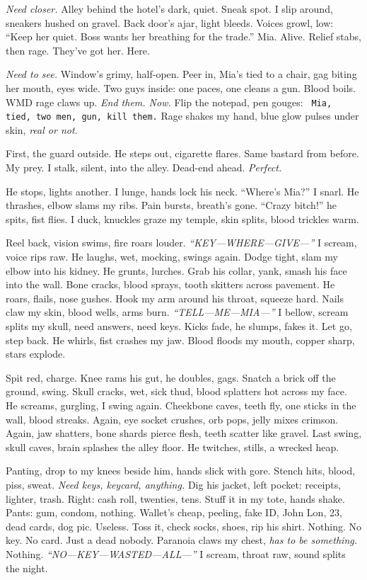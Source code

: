 \documentclass[12pt]{article}
\newcommand{\note}[1]{\texttt{\small \color{DarkGray} #1}}
\begin{document}
\textit{Need closer.} Alley behind the hotel’s dark, quiet. Sneak spot. I slip around, sneakers hushed on gravel. Back door’s ajar, light bleeds. Voices growl, low: “Keep her quiet. Boss wants her breathing for the trade.” \textnormal{Mia}. Alive. Relief stabs, then rage. They’ve got her. Here.

\textit{Need to see.} Window’s grimy, half-open. Peer in, \textnormal{Mia}’s tied to a chair, gag biting her mouth, eyes wide. Two guys inside: one paces, one cleans a gun. Blood boils. WMD rage claws up. \textit{End them. Now.} Flip the notepad, pen gouges: \note{Mia, tied, two men, gun, kill them.} Rage shakes my hand, blue glow pulses under skin, \textit{real or not.}

First, the guard outside. He steps out, cigarette flares. Same bastard from before. My prey. I stalk, silent, into the alley. Dead-end ahead. \textit{Perfect.}

He stops, lights another. I lunge, hands lock his neck. “Where’s \textnormal{Mia}?” I snarl. He thrashes, elbow slams my ribs. Pain bursts, breath’s gone. “Crazy bitch!” he spits, fist flies. I duck, knuckles graze my temple, skin splits, blood trickles warm.

Reel back, vision swims, fire roars louder. \textit{“KEY—WHERE—GIVE—”} I scream, voice rips raw. He laughs, wet, mocking, swings again. Dodge tight, slam my elbow into his kidney. He grunts, lurches. Grab his collar, yank, smash his face into the wall. Bone cracks, blood sprays, tooth skitters across pavement. He roars, flails, nose gushes. Hook my arm around his throat, squeeze hard. Nails claw my skin, blood wells, arms burn. \textit{“TELL—ME—MIA—”} I bellow, scream splits my skull, need answers, need keys. Kicks fade, he slumps, fakes it. Let go, step back. He whirls, fist crashes my jaw. Blood floods my mouth, copper sharp, stars explode.

Spit red, charge. Knee rams his gut, he doubles, gags. Snatch a brick off the ground, swing. Skull cracks, wet, sick thud, blood splatters hot across my face. He screams, gurgling, I swing again. Cheekbone caves, teeth fly, one sticks in the wall, blood streaks. Again, eye socket crushes, orb pops, jelly mixes crimson. Again, jaw shatters, bone shards pierce flesh, teeth scatter like gravel. Last swing, skull caves, brain splashes the alley floor. He twitches, stills, a wrecked heap.

Panting, drop to my knees beside him, hands slick with gore. Stench hits, blood, piss, sweat. \textit{Need keys, keycard, anything.} Dig his jacket, left pocket: receipts, lighter, trash. Right: cash roll, twenties, tens. Stuff it in my tote, hands shake. Pants: gum, condom, nothing. Wallet’s cheap, peeling, fake ID, \textnormal{John Lon}, 23, dead cards, dog pic. Useless. Toss it, check socks, shoes, rip his shirt. Nothing. No key. No card. Just a dead nobody. Paranoia claws my chest, \textit{has to be something.} Nothing. \textit{“NO—KEY—WASTED—ALL—”} I scream, throat raw, sound splits the night.
\end{document}
